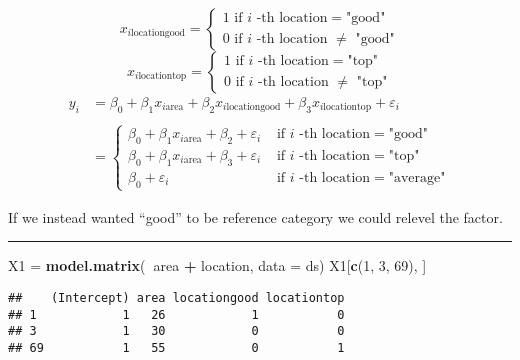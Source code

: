 \documentclass[]{article}
\newenvironment{Shaded}{\begin{snugshade}}{\end{snugshade}}
\newcommand{\DataTypeTok}[1]{\textcolor[rgb]{0.13,0.29,0.53}{#1}}
\newcommand{\DecValTok}[1]{\textcolor[rgb]{0.00,0.00,0.81}{#1}}
\newcommand{\KeywordTok}[1]{\textcolor[rgb]{0.13,0.29,0.53}{\textbf{#1}}}
\newcommand{\NormalTok}[1]{#1}
\newcommand{\OperatorTok}[1]{\textcolor[rgb]{0.81,0.36,0.00}{\textbf{#1}}}
\newcommand{\StringTok}[1]{\textcolor[rgb]{0.31,0.60,0.02}{#1}}
\begin{document}
\[x_{i \text{locationgood}} = \begin{cases} 1 \text{ if } i \text{ -th location}=\text{"good"} \\ 0 \text{ if } i \text{ -th location }\neq\text{ "good"} \end{cases}\]
\[x_{i \text{locationtop}} = \begin{cases} 1 \text{ if } i \text{ -th location}=\text{"top"} \\ 0 \text{ if } i \text{ -th location }\neq\text{ "top"} \end{cases}\]
\[\begin{aligned} y_i &= \beta_0 + \beta_1 x_{i \text{area}} + \beta_2 x_{i \text{locationgood}}+\beta_3 x_{i \text{locationtop}} + \varepsilon_i\\\\ &= \begin{cases} \beta_0 + \beta_1 x_{i \text{area}}+ \beta_2 + \varepsilon_i  &\text{ if } i \text{ -th location}=\text{"good"}  \\ \beta_0 + \beta_1 x_{i \text{area}}+ \beta_3 + \varepsilon_i &\text{ if } i \text{ -th location}=\text{"top"} \\ \beta_0 + \varepsilon_i &\text{ if } i \text{ -th location}=\text{"average"}\end{cases}\end{aligned}\]

If we instead wanted ``good'' to be reference category we could relevel
the factor.

\begin{center}\rule{0.5\linewidth}{\linethickness}\end{center}

\begin{Shaded}
\begin{Highlighting}[]
\NormalTok{X1 =}\StringTok{ }\KeywordTok{model.matrix}\NormalTok{(}\OperatorTok{~}\NormalTok{area }\OperatorTok{+}\StringTok{ }\NormalTok{location, }\DataTypeTok{data =}\NormalTok{ ds)}
\NormalTok{X1[}\KeywordTok{c}\NormalTok{(}\DecValTok{1}\NormalTok{, }\DecValTok{3}\NormalTok{, }\DecValTok{69}\NormalTok{), ]}
\end{Highlighting}
\end{Shaded}

\begin{verbatim}
##    (Intercept) area locationgood locationtop
## 1            1   26            1           0
## 3            1   30            0           0
## 69           1   55            0           1
\end{verbatim}
\end{document}
